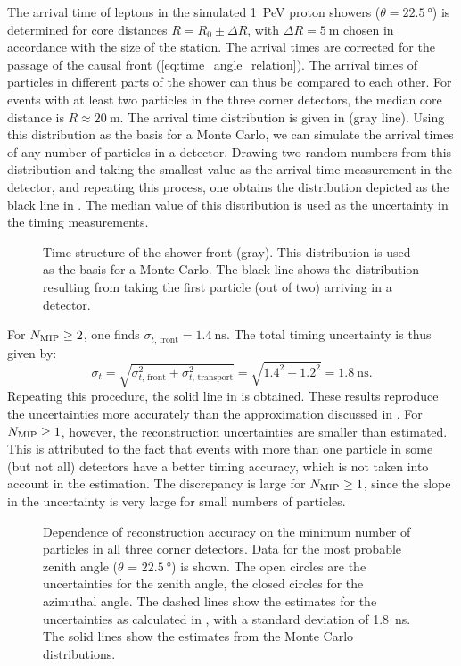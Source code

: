 The arrival time of
leptons in the simulated \SI{1}{\peta\electronvolt} proton showers ($\theta =
\SI{22.5}{\degree}$) is determined for core distances $R = R_0 \pm
\Delta R$, with $\Delta R = \SI{5}{\meter}$ chosen in accordance with the size
of the \hisparc station. The arrival times are corrected for the passage of the causal
front (\eqref{eq:time_angle_relation}). The arrival times of particles in
different parts of the shower can thus be compared to each other. For events with at least two
particles in the three corner detectors, the median core distance is $R \approx
\SI{20}{\meter}$. The arrival time distribution is given in
 (gray line). Using this distribution as
the basis for a Monte Carlo, we can simulate the arrival times of any number of
particles in a detector. Drawing two random
numbers from this distribution and taking the smallest value as the arrival time
measurement in the detector, and repeating this process, one obtains the
distribution depicted as the black line in
. The median value of this distribution is
used as the uncertainty in the timing measurements.
\begin{figure}
\centering

\caption{Time structure of the shower front (gray). This distribution is used as
the basis for a Monte Carlo. The black line shows the distribution resulting
from taking the first particle (out of two) arriving in a detector.}
\label{fig:montecarlo-arrival-times}
\end{figure}
For $N_\mathrm{\mip} \geq 2$, one finds $\sigma_{t,\, \mathrm{front}} =
\SI{1.4}{\nano\second}$. The total timing uncertainty is thus given by:
\begin{equation}
\sigma_t = \sqrt{\sigma_{t,\, \mathrm{front}}^2 + \sigma_{t,\,
\mathrm{transport}}^2} = \sqrt{1.4^2 + 1.2^2} = \SI{1.8}{\nano\second}.
\label{eq:ch4-timing1}
\end{equation}
Repeating this procedure, the solid line in  is
obtained. These results reproduce the uncertainties more accurately than the
approximation discussed in \cite{Steijger:2010-firsthit}. For
$N_\mathrm{\mip} \geq 1$, however, the reconstruction uncertainties are
smaller than estimated. This is attributed to the fact that events with
more than one particle in some (but not all) detectors have a better
timing accuracy, which is not taken into account in the estimation. The
discrepancy is large for $N_\mathrm{\mip} \geq 1$, since the slope in the
uncertainty is very large for small numbers of particles.
\begin{figure}
\centering

\caption{Dependence of reconstruction accuracy on the minimum number of
particles in all three corner detectors.  Data for the most probable
zenith angle ($\theta$ = $\SI{22.5}{\degree}$) is shown.  The open circles
are the uncertainties for the zenith angle, the closed circles for the
azimuthal angle. The dashed lines show the estimates for the uncertainties
as calculated in \cite{Steijger:2010-firsthit}, with a standard deviation
of \SI{1.8}{\nano\second}. The solid lines show the estimates from the
Monte Carlo distributions.}
\label{fig:results-sim-mip-full}
\end{figure}

